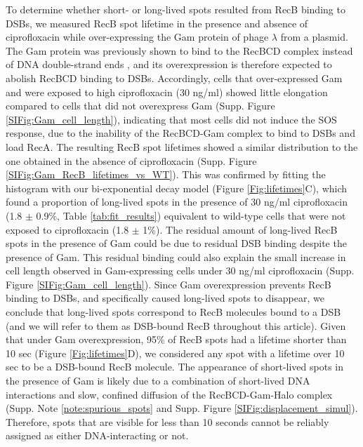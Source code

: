 To determine whether short- or long-lived spots resulted from RecB binding to DSBs, we measured RecB spot lifetime in the presence and absence of ciprofloxacin while over-expressing the Gam protein of phage $\lambda$ from a plasmid. The Gam protein was previously shown to bind to the RecBCD complex instead of DNA double-strand ends \cite{Wilkinson2016}, and its overexpression is therefore expected to abolish RecBCD binding to DSBs. Accordingly, cells that over-expressed Gam and were exposed to high ciprofloxacin (30 ng/ml) showed little elongation compared to cells that did not overexpress Gam (Supp. Figure \ref{SIFig:Gam_cell_length}), indicating that most cells did not induce the SOS response, due to the inability of the RecBCD-Gam complex to bind to DSBs and load RecA. The resulting RecB spot lifetimes showed a similar distribution to the one obtained in the absence of ciprofloxacin (Supp. Figure \ref{SIFig:Gam_RecB_lifetimes_vs_WT}). This was confirmed by fitting the histogram with our bi-exponential decay model (Figure \ref{Fig:lifetimes}C), which found a proportion of long-lived spots in the presence of 30 ng/ml ciprofloxacin (1.8 $\pm$ 0.9\%, Table \ref{tab:fit_results}) equivalent to wild-type cells that were not exposed to ciprofloxacin (1.8 $\pm$ 1\%). The residual amount of long-lived RecB spots in the presence of Gam could be due to residual DSB binding despite the presence of Gam. This residual binding could also explain the small increase in cell length observed in Gam-expressing cells under 30 ng/ml ciprofloxacin (Supp. Figure \ref{SIFig:Gam_cell_length}). Since Gam overexpression prevents RecB binding to DSBs, and specifically caused long-lived spots to disappear, we conclude that long-lived spots correspond to RecB molecules bound to a DSB (and we will refer to them as DSB-bound RecB throughout this article). Given that under Gam overexpression, 95\% of RecB spots had a lifetime shorter than 10 sec (Figure \ref{Fig:lifetimes}D), we considered any spot with a lifetime over 10 sec to be a DSB-bound RecB molecule. The appearance of short-lived spots in the presence of Gam is likely due to a combination of short-lived DNA interactions and slow, confined diffusion of the RecBCD-Gam-Halo complex (Supp. Note \ref{note:spurious_spots} and Supp. Figure \ref{SIFig:displacement_simul}). Therefore, spots that are visible for less than 10 seconds cannot be reliably assigned as either DNA-interacting or not.

